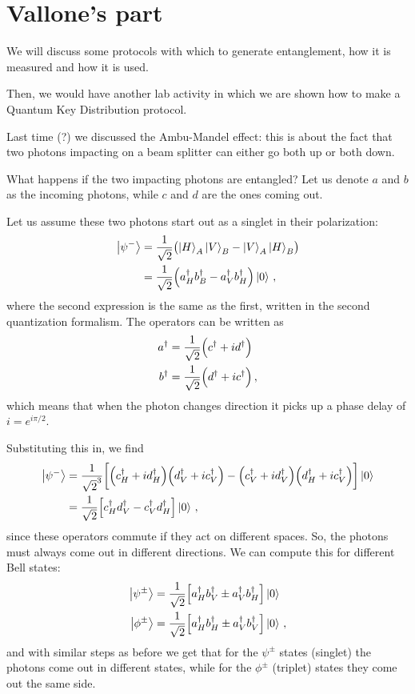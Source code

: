 \documentclass[main.tex]{subfiles}
\begin{document}

\section{Vallone's part}

We will discuss some protocols with which to generate entanglement, how it is measured and how it is used. 

Then, we would have another lab activity in which we are shown how to make a Quantum Key Distribution protocol.

Last time (?) we discussed the Ambu-Mandel effect: this is about the fact that two photons impacting on a beam splitter can either go both up or both down. 

What happens if the two impacting photons are entangled?
Let us denote \(a\) and \(b\) as the incoming photons, while \(c\) and \(d\) are the ones coming out. 

Let us assume these two photons start out as a singlet in their polarization: 
%
\begin{align}
\ket{\psi^{-}} &= \frac{1}{\sqrt{2}}
\qty(\ket{H}_{A} \ket{V}_{B}  - \ket{V}_{A} \ket{H}_{B} )  \\
&= \frac{1}{\sqrt{2}} \qty(a ^\dag_{H} b ^\dag_{B} - a ^\dag_{V} b ^\dag_{H}) \ket{0}
\,,
\end{align}
%
where the second expression is the same as the first, written in the second quantization formalism. 
The operators can be written as 
%
\begin{align}
a ^\dag &= \frac{1}{\sqrt{2}} \qty(c ^\dag + i d ^\dag) \\
b ^\dag &= \frac{1}{\sqrt{2}} \qty(d ^\dag + i c ^\dag) 
\,,
\end{align}
%
which means that when the photon changes direction it picks up a phase delay of \(i = e^{i \pi /2}\). 

Substituting this in, we find 
%
\begin{align}
\ket{\psi^{-}} &= \frac{1}{\sqrt{2}^3}
\qty[\qty(c_{H} ^\dag + i d_{H} ^\dag)\qty(d_{V} ^\dag + i c_{V} ^\dag)   - \qty(c_{V} ^\dag + i d_{V} ^\dag)\qty(d_{H} ^\dag + i c_{V}^\dag) ] \ket{0}  \\
&= \frac{1}{\sqrt{2}} \qty[c_{H} ^\dag d_{V} ^\dag - c_{V} ^\dag d_{H} ^\dag] \ket{0}
\,,
\end{align}
%
since these operators commute if they act on different spaces. 
So, the photons must always come out in different directions. We can compute this for different Bell states: 
%
\begin{align}
\ket{\psi^{\pm}} &= \frac{1}{\sqrt{2}} \qty[a_{H} ^\dag b_{V} ^\dag \pm a_{V} ^\dag b_{H} ^\dag] \ket{0} \\
\ket{\phi^{\pm}} &= \frac{1}{\sqrt{2}} \qty[a_{H} ^\dag b_{H} ^\dag \pm a_{V} ^\dag b_{V} ^\dag] \ket{0} 
\,,
\end{align}
%
and with similar steps as before we get that for the \(\psi^{\pm }\) states (singlet) the photons come out in different states, while for the \(\phi^{\pm }\) (triplet) states they come out the same side. 
\end{document}
